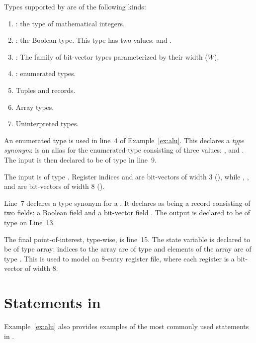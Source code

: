 Types supported by \uclid{} are of the following kinds: 
\begin{enumerate}
    \item {}: the type of mathematical integers.
    \item {}: the Boolean type. This type has two values:  and .
    \item {}: The family of bit-vector types parameterized by their width ($W$).
    \item {}: enumerated types.
    \item Tuples and records.
    \item Array types.
    \item Uninterpreted types.
\end{enumerate}

An enumerated type is used in line~4 of Example~\ref{ex:alu}. This declares a \textit{type synonym}:  is an alias for the enumerated type consisting of three values: ,  and . The input  is then declared to be of type  in line~9. 

The input  is of type . Register indices  and  are bit-vectors of width 3 (), while , ,  and  are bit-vectors of width 8 ().

Line~7 declares a type synonym for a . It declares  as being a record consisting of two fields: a Boolean field  and a bit-vector field . The output  is declared to be of type  on Line~13.

The final point-of-interest, type-wise, is line~15. The state variable  is declared to be of type array: indices to the array are of type  and elements of the array are of type . This is used to model an 8-entry register file, where each register is a bit-vector of width 8.

\section{Statements in \uclid{}}

Example~\ref{ex:alu} also provides examples of the most commonly used statements in \uclid{}. 

